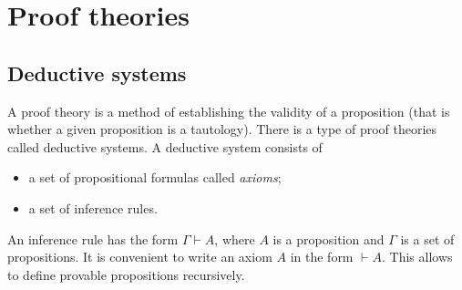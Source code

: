 \section{Proof theories}
\subsection{Deductive systems}
A proof theory is a method of establishing the validity of a proposition (that is whether a given proposition is a tautology).
There is a type of proof theories called deductive systems.
A deductive system consists of
\begin{itemize}
\item a set of propositional formulas called \emph{axioms};
\item a set of inference rules.
\end{itemize}

An inference rule has the form $\Gamma \vdash A$, where $A$ is a proposition and $\Gamma$ is a set of propositions.
It is convenient to write an axiom $A$ in the form $\vdash A$.
This allows to define provable propositions recursively.
